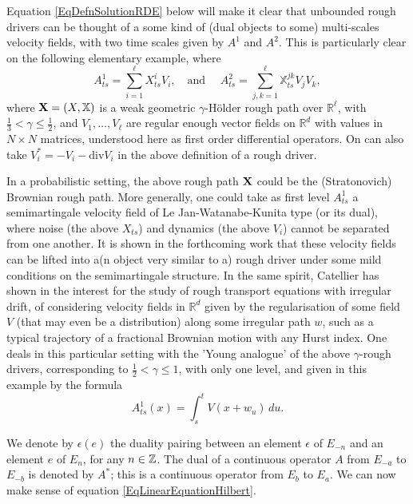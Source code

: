 \documentclass[11pt,a4paper]{amsart}
\newcommand{\RR}{\mathbb{R}}  \newcommand{\CC}{\mathbb{C}}  \newcommand{\LL}{\mathbb{L}}  \newcommand{\WW}{\mathbb{W}}
\newcommand{\bbX}{\mathbb{X}}
\newcommand{\ep}{\epsilon}
\renewcommand{\leq}{\leqslant}
\newcommand{\ssk}{\smallskip}
\numberwithin{equation}{section} %
\begin{document}
\medskip

Equation \eqref{EqDefnSolutionRDE} below will make it clear that unbounded rough drivers can be thought of a some kind of (dual objects to some) multi-scales velocity fields, with two time scales given by $A^1$ and $A^2$. This is particularly clear on the following elementary example, where
$$
A^1_{ts} = \sum_{i=1}^\ell X^i_{ts}V_i, \quad \textrm{and } \quad A^2_{ts} = \sum_{j,k=1}^\ell \bbX^{jk}_{ts}V_jV_k,
$$
where ${\bfX} = (X,\bbX)$ is a weak geometric $\gamma$-H\"older rough path over $\RR^\ell$, with $\frac{1}{3}<\gamma\leq \frac{1}{2}$, and $V_1,\dots, V_\ell$ are regular enough vector fields on $\RR^d$ with values in $N\times N$ matrices, understood here as first order differential operators. On can also take $V_i^* = -V_i - \textrm{div}V_i$ in the above definition of a rough driver.

\ssk

In a probabilistic setting, the above rough path ${\bf X}$ could be the (Stratonovich) Brownian rough path. More generally, one could take as first level $A^1_{ts}$ a semimartingale velocity field of Le Jan-Watanabe-Kunita type (or its dual), where noise (the above $X_{ts}$) and dynamics (the above $V_i$) cannot be separated from one another. It is shown in the forthcoming work \cite{BailleulRiedel} that these velocity fields can be lifted into a(n object very similar to a) rough driver under some mild conditions on the semimartingale structure. In the same spirit, Catellier has shown in \cite{Catellierregularisation, CatellierTransport} the interest for the study of rough transport equations with irregular drift, of considering velocity fields in $\RR^d$ given by the regularisation of some field $V$ (that may even be a distribution) along some irregular path $w$, such as a typical trajectory of a fractional Brownian motion with any Hurst index. One deals in this particular setting with the 'Young analogue' of the above $\gamma$-rough drivers, corresponding to $\frac{1}{2}<\gamma\leq 1$, with only one level, and given in this example by the formula
$$
A^1_{ts}(x) = \int_s^t V(x+w_u)\,du.
$$

\medskip

We denote by $\ep(e)$ the duality pairing between an element $\ep$ of $E_{-n}$ and an element $e$ of $E_n$, for any $n\in\mathbb{Z}$. The dual of a continuous operator $A$ from $E_{-a}$ to $E_{-b}$ is denoted by $A^*$; this is a continuous operator from $E_b$ to $E_a$. We can now make sense of equation \eqref{EqLinearEquationHilbert}. 
\end{document}
